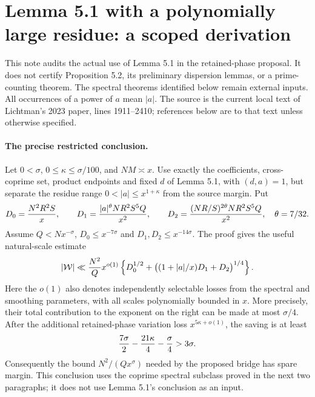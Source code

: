 \section*{Lemma 5.1 with a polynomially large residue: a scoped derivation}
\label{sec:l51-large-a-audit-20261009}

This note audits the actual use of Lemma 5.1 in the retained-phase
proposal.  It does not certify Proposition 5.2, its preliminary dispersion
lemmas, or a prime-counting theorem.  The spectral theorems identified below
remain external inputs.  All occurrences of a power of $a$ mean $|a|$.
The source is the current local text of Lichtman's 2023 paper, lines
1911--2410; references below are to that text unless otherwise specified.

\paragraph{The precise restricted conclusion.}
Let $0<\sigma$, $0\leq\kappa\leq\sigma/100$, and $NM\asymp x$.
Use exactly the coefficients, cross-coprime set, product endpoints and fixed
$d$ of Lemma 5.1, with $(d,a)=1$, but separate the residue range
$0<|a|\leq x^{1+\kappa}$ from the source margin.  Put
\[
 D_0={N^2R^2S\over x},\qquad
 D_1={|a|^\theta NR^2S^5Q\over x^2},\qquad
 D_2={(NR/S)^{2\theta}NR^2S^5Q\over x^2},\quad \theta=7/32.
\]
Assume $Q<Nx^{-\sigma}$, $D_0\leq x^{-7\sigma}$ and
$D_1,D_2\leq x^{-14\sigma}$.  The proof gives the useful natural-scale
estimate
\begin{equation}\label{eq:l51-natural-large-a}
 |\mathcal W|\ll {N^2\over Q}x^{o(1)}
 \left\{D_0^{1/2}+\big((1+|a|/x)D_1+D_2\big)^{1/4}\right\}.
\end{equation}
Here the $o(1)$ also denotes independently selectable losses from the
spectral and smoothing parameters, with all scales polynomially bounded
in $x$.  More precisely, their total contribution to the exponent on the
right can be made at most $\sigma/4$.  After the additional retained-phase
variation loss $x^{5\kappa+o(1)}$, the saving is at least
\[
 {7\sigma\over2}-{21\kappa\over4}-{\sigma\over4}>3\sigma.
\]
Consequently the bound $N^2/(Qx^{\sigma})$ needed by the proposed bridge
has spare margin.  This conclusion uses the coprime spectral subclass
proved in the next two paragraphs; it does not use Lemma 5.1's conclusion
as an input.

